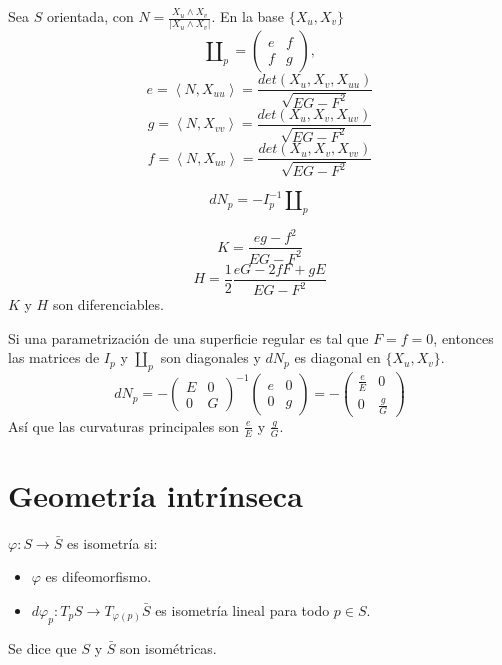 \begin{proposition}
    Sea $S$ orientada, con $N = \frac{X_u \land X_v}{|X_u \land X_v|}$. En la base $\{ X_u, X_v \}$
    $$\amalg_p =
        \begin{pmatrix}
            e & f \\
            f & g
        \end{pmatrix},$$
    $$e = \left\langle N, X_{uu} \right\rangle = \frac{det(X_u, X_v, X_{uu})}{\sqrt{EG-F^2}}$$
    $$g = \left\langle N, X_{vv} \right\rangle = \frac{det(X_u, X_v, X_{uv})}{\sqrt{EG-F^2}}$$
    $$f = \left\langle N, X_{uv} \right\rangle = \frac{det(X_u, X_v, X_{vv})}{\sqrt{EG-F^2}}$$
\end{proposition}

\begin{proposition}
    $$dN_p = -I_p^{-1} \amalg_p$$
\end{proposition}

\begin{proposition}
    $$K = \frac{eg-f^2}{EG-F^2}$$
    $$H = \frac{1}{2} \frac{eG - 2fF + gE}{EG-F^2}$$
    $K$ y $H$ son diferenciables.
\end{proposition}

\begin{remark}
    Si una parametrización de una superficie regular es tal que $F = f = 0$, entonces las matrices de $I_p$ y $\amalg_p$ son diagonales y $dN_p$ es diagonal en $\{X_u, X_v\}$.
    $$dN_p = -
        \begin{pmatrix}
            E & 0 \\
            0 & G
        \end{pmatrix}^{-1}
        \begin{pmatrix}
            e & 0 \\
            0 & g
        \end{pmatrix} = -
        \begin{pmatrix}
            \frac{e}{E} & 0           \\
            0           & \frac{g}{G}
        \end{pmatrix}$$
    Así que las curvaturas principales son $\frac{e}{E}$ y $\frac{g}{G}$.
\end{remark}

\section{Geometría intrínseca}

\begin{definition}
    $\varphi : S \to \bar{S}$ es isometría si:
    \begin{itemize}
        \item $\varphi$ es difeomorfismo.
        \item $d\varphi_p : T_pS \to T_{\varphi(p)}\bar{S}$ es isometría lineal para todo $p \in S$.
    \end{itemize}
    Se dice que $S$ y $\bar{S}$ son isométricas.
\end{definition}

